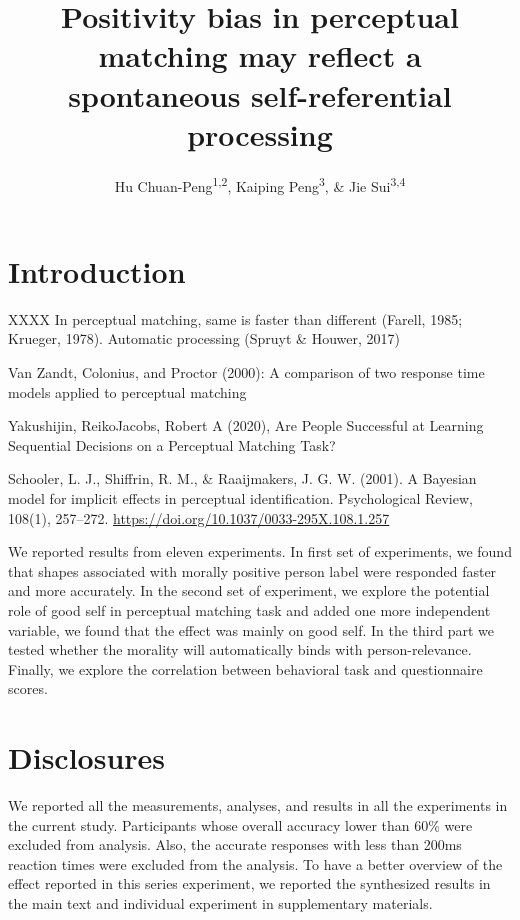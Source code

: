 \documentclass[
  english,
  man]{apa6}
\author{Hu Chuan-Peng\textsuperscript{1,2}, Kaiping Peng\textsuperscript{3}, \& Jie Sui\textsuperscript{3,4}}
\affiliation{
\vspace{0.5cm}
\textsuperscript{1} TBA\\\textsuperscript{2} Leibniz Institute for Resilience Research, 55131 Mainz, Germany\\\textsuperscript{3} Tsinghua University, 100084 Beijing, China\\\textsuperscript{4} University of Aberdeen, Aberdeen, Scotland}
\title{Positivity bias in perceptual matching may reflect a spontaneous self-referential processing}
\date{}
\begin{document}
\maketitle

\hypertarget{introduction}{%
\section{Introduction}\label{introduction}}

XXXX
In perceptual matching, same is faster than different (Farell, 1985; Krueger, 1978).
Automatic processing (Spruyt \& Houwer, 2017)

Van Zandt, Colonius, and Proctor (2000): A comparison of two response time models applied to perceptual matching

Yakushijin, ReikoJacobs, Robert A (2020), Are People Successful at Learning Sequential Decisions on a Perceptual Matching Task?

Schooler, L. J., Shiffrin, R. M., \& Raaijmakers, J. G. W. (2001). A Bayesian model for implicit effects in perceptual identification. Psychological Review, 108(1), 257--272. \url{https://doi.org/10.1037/0033-295X.108.1.257}

We reported results from eleven experiments. In first set of experiments, we found that shapes associated with morally positive person label were responded faster and more accurately. In the second set of experiment, we explore the potential role of good self in perceptual matching task and added one more independent variable, we found that the effect was mainly on good self. In the third part we tested whether the morality will automatically binds with person-relevance. Finally, we explore the correlation between behavioral task and questionnaire scores.

\hypertarget{disclosures}{%
\section{Disclosures}\label{disclosures}}

We reported all the measurements, analyses, and results in all the experiments in the current study. Participants whose overall accuracy lower than 60\% were excluded from analysis. Also, the accurate responses with less than 200ms reaction times were excluded from the analysis. To have a better overview of the effect reported in this series experiment, we reported the synthesized results in the main text and individual experiment in supplementary materials.
\end{document}
